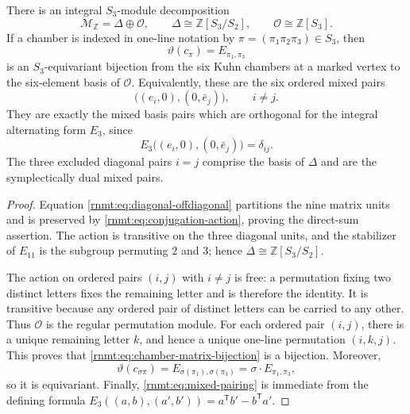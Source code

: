 \begin{theorem}
\label{rnmt:thm:regular-torsor}
There is an integral \(S_3\)-module decomposition
\begin{equation}
 \mathcal M_{\mathbb Z}=\Delta\oplus\mathcal O,
 \qquad
 \Delta\cong\mathbb Z[S_3/S_2],
 \qquad
 \mathcal O\cong\mathbb Z[S_3].
 \label{rnmt:eq:module-decomposition}
\end{equation}
If a chamber is indexed in one-line notation by
\(\pi=(\pi_1\pi_2\pi_3)\in S_3\), then
\begin{equation}
 \vartheta(c_\pi)=E_{\pi_1,\pi_3}
 \label{rnmt:eq:chamber-matrix-bijection}
\end{equation}
is an \(S_3\)-equivariant bijection from the six Kuhn chambers at a marked
vertex to the six-element basis of \(\mathcal O\).  Equivalently, these are
the six ordered mixed pairs
\begin{equation}
 \bigl((e_i,0),(0,\bar e_j)\bigr),\qquad i\ne j.
 \label{rnmt:eq:offdiagonal-pairs}
\end{equation}
They are exactly the mixed basis pairs which are orthogonal for the integral
alternating form \(E_3\), since
\begin{equation}
 E_3\bigl((e_i,0),(0,\bar e_j)\bigr)=\delta_{ij}.
 \label{rnmt:eq:mixed-pairing}
\end{equation}
The three excluded diagonal pairs \(i=j\) comprise the basis of \(\Delta\)
and are the symplectically dual mixed pairs.
\end{theorem}

\begin{proof}
Equation \eqref{rnmt:eq:diagonal-offdiagonal} partitions the nine matrix
units and is preserved by \eqref{rnmt:eq:conjugation-action}, proving the
direct-sum assertion.  The action is transitive on the three diagonal units,
and the stabilizer of \(E_{11}\) is the subgroup permuting \(2\) and \(3\);
hence \(\Delta\cong\mathbb Z[S_3/S_2]\).

The action on ordered pairs \((i,j)\) with \(i\ne j\) is free: a permutation
fixing two distinct letters fixes the remaining letter and is therefore the
identity.  It is transitive because any ordered pair of distinct letters can
be carried to any other.  Thus \(\mathcal O\) is the regular permutation
module.  For each ordered pair \((i,j)\), there is a unique remaining letter
\(k\), and hence a unique one-line permutation \((i,k,j)\).  This proves
that \eqref{rnmt:eq:chamber-matrix-bijection} is a bijection.  Moreover,
\[
 \vartheta(c_{\sigma\pi})
 =E_{\sigma(\pi_1),\sigma(\pi_3)}
 =\sigma\cdot E_{\pi_1,\pi_3},
\]
so it is equivariant.  Finally, \eqref{rnmt:eq:mixed-pairing} is immediate
from the defining formula
\(E_3((a,b),(a',b'))=a^{\mathsf T}b'-b^{\mathsf T}a'\).
\end{proof}

